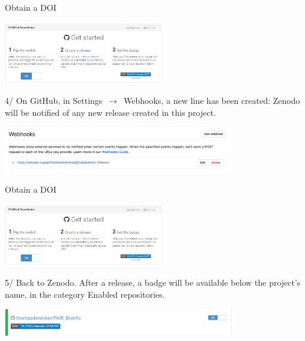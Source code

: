 \begin{frame}{Obtain a DOI}

{\centering\includegraphics[width=7cm]{08_sharing/images/zenodo_github.png}\par }

4/ On GitHub, in Settings $\,\to\,$ Webhooks, a new line has been created: Zenodo will be notified of any new release created in this project.

\begin{center}
    \includegraphics[width=10cm]{08_sharing/images/webhook_zenodo.png}
\end{center}

\end{frame}

\begin{frame}{Obtain a DOI}

{\centering\includegraphics[width=7cm]{08_sharing/images/zenodo_github.png}\par }

5/ Back to Zenodo. After a release, a badge will be available below the project's name, in the category Enabled repositories. 

\begin{center}
    \includegraphics[width=10cm]{08_sharing/images/zenodo_badge.png}
\end{center}

\end{frame}

